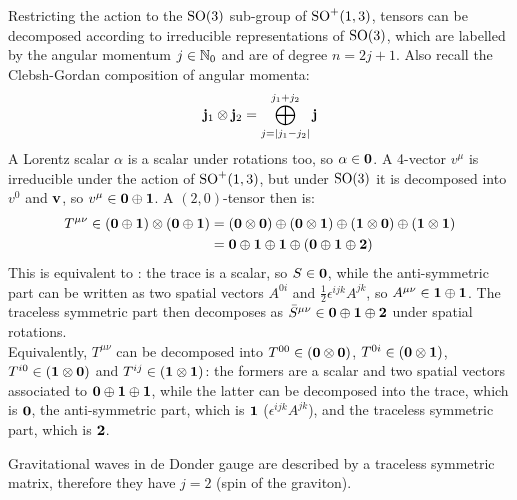 Restricting the action to the $ \mathrm{SO}(3) $ sub-group of $ \mathrm{SO}^+(1,3) $, tensors can be decomposed according to irreducible representations of $ \mathrm{SO}(3) $, which are labelled by the angular momentum $ j \in \mathbb{N}_0 $ and are of degree $ n = 2j + 1 $. Also recall the Clebsh-Gordan composition of angular momenta:
\begin{equation}
  \mathbf{j}_1 \otimes \mathbf{j}_2 = \bigoplus_{j = \left\lvert j_1 - j_2\right\rvert}^{j_1 + j_2} \mathbf{j}
\end{equation}
A Lorentz scalar $ \alpha $ is a scalar under rotations too, so $ \alpha \in \mathbf{0} $. A 4-vector $ v^\mu $ is irreducible under the action of $ \mathrm{SO}^+(1,3) $, but under $ \mathrm{SO}(3) $ it is decomposed into $ v^0 $ and $ \mathbf{v} $, so $ v^\mu \in \mathbf{0} \oplus \mathbf{1} $. A $ (2,0) $-tensor then is:
\begin{equation*}
  \begin{split}
    T^{\mu \nu} \in \left( \mathbf{0} \oplus \mathbf{1} \right) \otimes \left( \mathbf{0} \oplus \mathbf{1} \right)
    &= \left( \mathbf{0} \otimes \mathbf{0} \right) \oplus \left( \mathbf{0} \otimes \mathbf{1} \right) \oplus \left( \mathbf{1} \otimes \mathbf{0} \right) \oplus \left( \mathbf{1} \otimes \mathbf{1} \right) \\
    &= \mathbf{0} \oplus \mathbf{1} \oplus \mathbf{1} \oplus \left( \mathbf{0} \oplus \mathbf{1} \oplus \mathbf{2} \right)
  \end{split}
\end{equation*}
This is equivalent to : the trace is a scalar, so $ S \in \mathbf{0} $, while the anti-symmetric part can be written as two spatial vectors $ A^{0i} $ and $ \frac{1}{2} \epsilon^{ijk} A^{jk} $, so $ A^{\mu \nu} \in \mathbf{1} \oplus \mathbf{1} $. The traceless symmetric part then decomposes as $ \bar{S}^{\mu \nu} \in \mathbf{0} \oplus \mathbf{1} \oplus \mathbf{2} $ under spatial rotations.\\
Equivalently, $ T^{\mu \nu} $ can be decomposed into $ T^{00} \in \left( \mathbf{0} \otimes \mathbf{0} \right) $, $ T^{0i} \in \left( \mathbf{0} \otimes \mathbf{1} \right) $, $ T^{i0} \in \left( \mathbf{1} \otimes \mathbf{0} \right) $ and $ T^{ij} \in \left( \mathbf{1} \otimes \mathbf{1} \right) $: the formers are a scalar and two spatial vectors associated to $ \mathbf{0} \oplus \mathbf{1} \oplus \mathbf{1} $, while the latter can be decomposed into the trace, which is $ \mathbf{0} $, the anti-symmetric part, which is $ \mathbf{1} $ ($ \epsilon^{ijk} A^{jk} $), and the traceless symmetric part, which is $ \mathbf{2} $.

\begin{example}{}{}
  Gravitational waves in de Donder gauge are described by a traceless symmetric matrix, therefore they have $ j = 2 $ (spin of the graviton).
\end{example}

